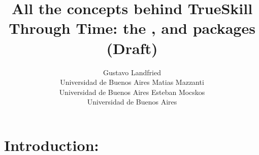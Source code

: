 \documentclass[article]{jss}
\author{Gustavo Landfried \\Universidad de Buenos Aires
   \And Matias Mazzanti \\Universidad de Buenos Aires
   \And Esteban Mocskos \\Universidad de Buenos Aires}
\title{All the concepts behind TrueSkill Through Time: the \proglang{R}, \proglang{Python} and \proglang{Julia} packages (Draft)}
\newif\ifen
\newif\ifes
\newcommand{\en}[1]{\ifen#1\fi}
\newcommand{\es}[1]{\ifes#1\fi}
\begin{document}
\lstset{language=Python}

\section[Introduction]{Introduction: } \label{sec:intro}


\en{Human develop complex skills over the course of a lifetime.}
\es{Los humanos desarrollan habilidades complejas a lo largo de su vida.}
%
\en{This is made possible by a special integration of biological, cognitive and social processes~\citep{Koster2020}.}
\es{Esto es posible gracias a una integraci\'on especial de los procesos biol\'ogicos, cognitivos y sociales~\citep{Koster2020}.}
%
\en{Our brains develop first followed by the body because this sequence allows a longer period of learning~\citep{GonzalezForero2018}.}
\es{Nuestros cerebros se desarrollan primero, seguidos por el cuerpo porque esta secuencia permite un per\'iodo m\'as largo de aprendizaje~\citep{GonzalezForero2018}.}
%
\en{Human life histories are distinguished by long periods of juvenile dependency, short intervals between births, and long postreproductive life span~\citep{Jones2011}.}
\es{Las historias de vida humanas se distinguen por largos per\'iodos de dependencia juvenil, cortos intervalos entre nacimientos y una larga vida posreproductiva~\citep{Jones2011}.}
%
\en{A special cognitive ability allows humans to learn things from others, and transmit innovations through generations~\citep{Herrmann2007}.}
\es{Una capacidad cognitiva especial le permite a los humanos aprender de los dem\'as y transmitir las innovaci\'on a través de la generaciones~\citep{Herrmann2007}.}
%
\en{As a population-based process, human adaptation is also affected by demographic characteristics, such as the size and structure of populations~\citep{derex2020-populationStructure}.}
\es{Al ser un proceso poblacional, la adaptaci\'on humana también se ve afectada por caracter\'isticas demogr\'aficas, como el tama\~no y estructura de las poblaciones~\citep{derex2020-populationStructure}.} 

\end{document}
